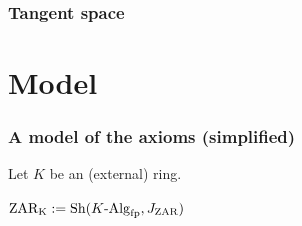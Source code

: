 \documentclass[aspectratio=1610]{beamer}
\begin{document}
\begin{frame}
  \frametitle{Tangent space}
\end{frame}

\section{Model}

\begin{frame}
  \frametitle{A model of the axioms (simplified)}

  Let $K$ be an (external) ring.

  \bigskip
  $\mathrm{ZAR_K} := \mathrm{Sh}(K\text{-}\mathrm{Alg}_{\mathrm{fp}}, J_{\mathrm{ZAR}})$
\end{frame}
\end{document}
